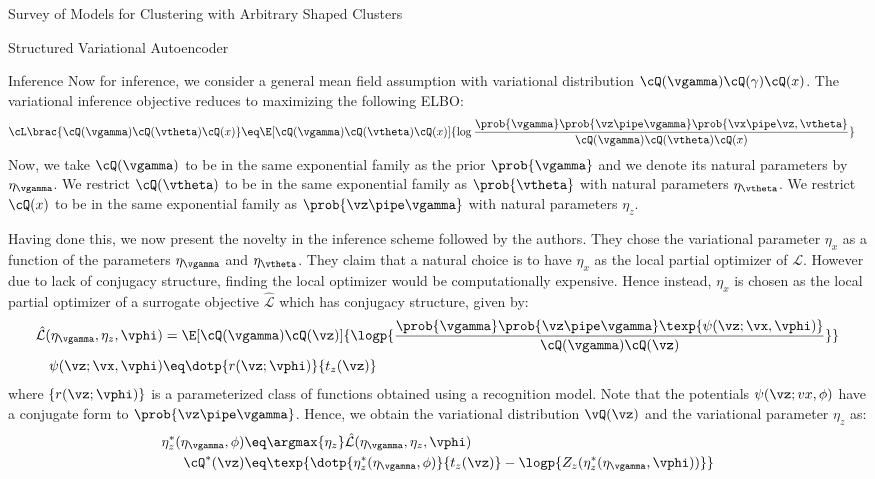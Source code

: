 \documentclass{article}
\begin{document}
\begin{psection}{Survey of Models for Clustering with Arbitrary Shaped Clusters}
\begin{psubsection}{Structured Variational Autoencoder}
\begin{pssubsection}{Inference}
			Now for inference, we consider a general mean field assumption with variational distribution $\cQ(\vgamma) \cQ(\gamma) \cQ(x)$. The variational inference objective reduces to maximizing the following ELBO:
			\begin{align*}
				\cL \brac{\cQ(\vgamma) \cQ(\vtheta) \cQ(x)} &\eq \E[\cQ(\vgamma) \cQ(\vtheta) \cQ(x)]{\log{\frac{\prob{\vgamma} \prob{\vz \pipe \vgamma} \prob{\vx \pipe \vz,\vtheta}}{\cQ(\vgamma) \cQ(\vtheta) \cQ(x)}}}
			\end{align*}
			Now, we take $\cQ(\vgamma)$ to be in the same exponential family as the prior $\prob{\vgamma}$ and we denote its natural parameters by $\eta_\vgamma$. We restrict $\cQ(\vtheta)$ to be in the same exponential family as $\prob{\vtheta}$ with natural parameters $\eta_\vtheta$. We restrict $\cQ(x)$ to be in the same exponential family as $\prob{\vz \pipe \vgamma}$ with natural parameters $\eta_z$.

			Having done this, we now present the novelty in the inference scheme followed by the authors. They chose the variational parameter $\eta_x$ as a function of the parameters $\eta_\vgamma$ and $\eta_\vtheta$. They claim that a natural choice is to have $\eta_x$ as the local partial optimizer of $\mathcal{L}$. However due to lack of conjugacy structure, finding the local optimizer would be computationally expensive. Hence instead, $\eta_x$ is chosen as the local partial optimizer of a surrogate objective $\hat{\mathcal{L}}$ which has conjugacy structure, given by:
			\begin{align*}
				\hat{\mathcal{L}}(\eta_\vgamma, \eta_z, \vphi) &= \E[\cQ(\vgamma) \cQ(\vz)]{\logp{\frac{\prob{\vgamma} \prob{\vz \pipe \vgamma} \texp{\psi(\vz; \vx, \vphi)}}{\cQ(\vgamma) \cQ(\vz)}}} \\
				\psi(\vz; \vx, \vphi) &\eq \dotp{r(\vz; \vphi)}{t_z(\vz)}
			\end{align*}
			where $\{r(\vz; \vphi)\}$ is a parameterized class of functions obtained using a recognition model. Note that the potentials $\psi(\vz; vx,\phi)$ have a conjugate form to $\prob{\vz \pipe \vgamma}$. Hence, we obtain the variational distribution $\vQ(\vz)$ and the variational parameter $\eta_z$ as:
			\begin{align*}
				\eta_z^{*}(\eta_\vgamma,\phi) &\eq \argmax{\eta_z} \hat{\mathcal{L}}(\eta_\vgamma, \eta_z, \vphi) \\
				\cQ^{*}(\vz) &\eq \texp{\dotp{\eta_z^{*}(\eta_\vgamma,\phi)}{t_z(\vz)} - \logp{Z_z(\eta_z^{*}(\eta_\vgamma, \vphi))}}
			\end{align*}


\end{pssubsection}
\end{psubsection}
\end{psection}
\end{document}
